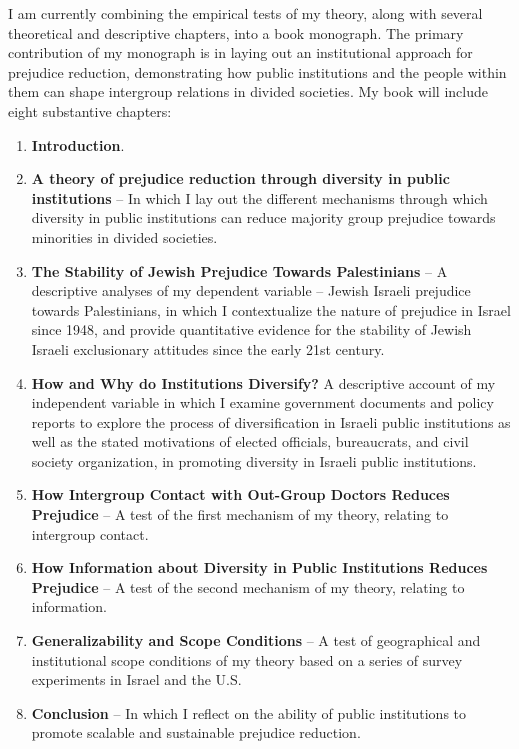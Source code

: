 \documentclass[12pt]{article}
\theoremstyle{plain}
\begin{document}
I am currently combining the empirical tests of my theory, along with several theoretical and descriptive chapters, into a book monograph. The primary contribution of my monograph is in laying out an institutional approach for prejudice reduction, demonstrating how public institutions and the people within them can shape intergroup relations in divided societies. My book will include eight substantive chapters:

\begin{enumerate}
\item \textbf{Introduction}.
\item \textbf{A theory of prejudice reduction through diversity in public institutions} -- In which I lay out the different mechanisms through which diversity in public institutions can reduce majority group prejudice towards minorities in divided societies.
\item \textbf{The Stability of Jewish Prejudice Towards Palestinians} -- A descriptive analyses of my dependent variable -- Jewish Israeli prejudice towards Palestinians, in which I contextualize the nature of prejudice in Israel since 1948, and provide quantitative evidence for the stability of Jewish Israeli exclusionary attitudes since the early 21st century.
\item \textbf{How and Why do Institutions Diversify?} A descriptive account of my independent variable in which I examine government documents and policy reports to explore the process of diversification in Israeli public institutions as well as the stated motivations of elected officials, bureaucrats, and civil society organization, in promoting diversity in Israeli public institutions.
\item \textbf{How Intergroup Contact with Out-Group Doctors Reduces Prejudice} -- A test of the first mechanism of my theory, relating to intergroup contact.
\item \textbf{How Information about Diversity in Public Institutions Reduces Prejudice} -- A test of the second mechanism of my theory, relating to information.
\item \textbf{Generalizability and Scope Conditions} -- A test of geographical and institutional scope conditions of my theory based on a series of survey experiments in Israel and the U.S.
\item \textbf{Conclusion} -- In which I reflect on the ability of public institutions to promote scalable and sustainable prejudice reduction.
\end{enumerate}








%
%
\end{document}
